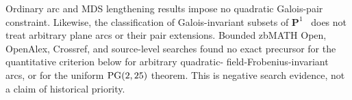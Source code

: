 Ordinary arc and MDS lengthening results
\cite{Alderson2005,AldersonBruenSilverman2007,Alderson2026} impose no
quadratic Galois-pair constraint.  Likewise, the classification of
Galois-invariant subsets of $\mathbf P^1$~\cite{LopezMaisnerNartXarles2002}
does not treat arbitrary plane arcs or their pair extensions.  Bounded
zbMATH Open, OpenAlex, Crossref, and source-level searches found no exact
precursor for the quantitative criterion below for arbitrary quadratic-
field-Frobenius-invariant arcs, or for the uniform $\operatorname{PG}(2,25)$ theorem.
This is negative search evidence, not a claim of historical priority.
